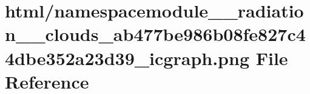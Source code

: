 \hypertarget{namespacemodule____radiation____clouds__ab477be986b08fe827c44dbe352a23d39__icgraph_8png}{}\section{html/namespacemodule\+\_\+\+\_\+radiation\+\_\+\+\_\+clouds\+\_\+ab477be986b08fe827c44dbe352a23d39\+\_\+icgraph.png File Reference}
\label{namespacemodule____radiation____clouds__ab477be986b08fe827c44dbe352a23d39__icgraph_8png}
